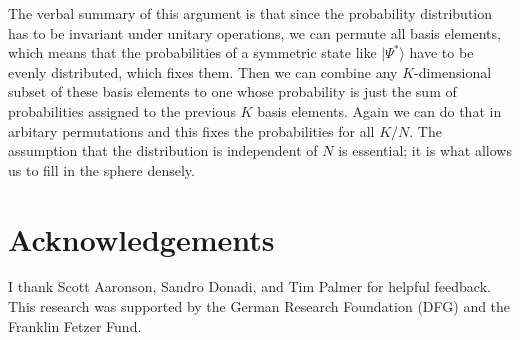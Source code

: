 \documentclass[11pt,twoside,A4]{article}
\begin{document}
The verbal summary of this argument is that since the probability distribution has to be invariant under unitary operations, we can permute all basis elements, which means that the probabilities of a symmetric state like $|\Psi^*\rangle$ have to be evenly distributed, which fixes them. Then we can combine any $K$-dimensional subset of these basis elements to one whose probability is just the sum of probabilities assigned to the previous $K$ basis elements. Again we can do that in arbitary permutations and this fixes the probabilities for all $K/N$. The assumption that the distribution is independent of $N$ is essential; it is what allows us to fill in the sphere densely. 

\section*{Acknowledgements}

I thank Scott Aaronson, Sandro Donadi, and Tim Palmer for helpful feedback. This research was supported by the German Research Foundation (DFG) and the Franklin Fetzer Fund. 
\end{document}

